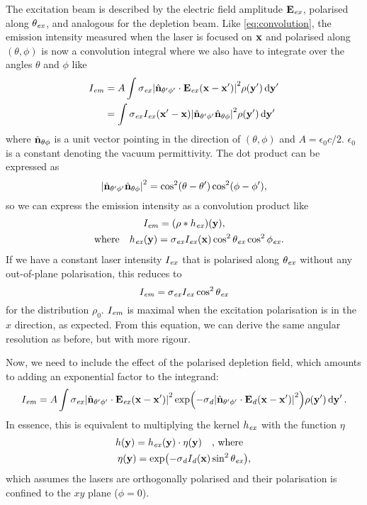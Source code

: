 The excitation beam is described by the electric field amplitude $ \vb{E}_{\mathit{ex}} $, polarised along $ \theta_{\mathit{ex}} $, and analogous for the depletion beam. Like \autoref{eq:convolution}, the emission intensity measured when the laser is focused on $ \vb{x} $ and polarised along $ (\theta, \phi)$ is now a convolution integral where we also have to integrate over the angles $ \theta $ and $ \phi $ like
\begin{equation}
	\begin{aligned}
		I_{\mathit{em}} 
			&= A \int 
				\sigma_{\mathit{ex}} \abs{\hat{\vb{n}}_{\theta'\phi'} \cdot \vb{E}_{\mathit{ex}}(\vb{x}-\vb{x}')}^2 
				\rho(\vb{y}') 
				\dd{\vb{y}'} \\
			&= \int 
				\sigma_{\mathit{ex}} I_{\mathit{ex}}(\vb{x}'-\vb{x}) \abs{\hat{\vb{n}}_{\theta'\phi'}\hat{\vb{n}}_{\theta\phi}}^2
				\rho(\vb{y}') 
				\dd{\vb{y}'}
	\end{aligned}
\end{equation}
where $ \hat{\vb{n}}_{\theta\phi} $ is a unit vector pointing in the direction of $ (\theta, \phi) $ and $ A = \epsilon_0c/2 $. $ \epsilon_0 $ is a constant denoting the vacuum permittivity. The dot product can be expressed as
\begin{equation}
	\abs{\hat{\vb{n}}_{\theta'\phi'}\hat{\vb{n}}_{\theta\phi}}^2 = \cos^2(\theta-\theta') \cos^2(\phi-\phi'),
\end{equation}
so we can express the emission intensity as a convolution product like
\begin{gather}
	I_\emm = (\rho*h_\exc)(\vb{y}), \\
	\qq{where} h_\exc(\vb{y}) = \sigma_\exc I_\exc(\vb{x}) \cos^2\theta_\exc\cos^2\phi_\exc.
\end{gather}
If we have a constant laser intensity $ I_{\mathit{ex}} $ that is polarised along $ \theta_{\mathit{ex}} $ without any out-of-plane polarisation, this reduces to
\begin{equation}
	I_{\mathit{em}} = \sigma_{\mathit{ex}} I_{\mathit{ex}} \cos^2\theta_{\mathit{ex}}
\end{equation}
for the distribution $ \rho_0 $. $ I_{\mathit{em}} $ is maximal when the excitation polarisation is in the $ x $ direction, as expected. From this equation, we can derive the same angular resolution as before, but with more rigour.

Now, we need to include the effect of the polarised depletion field, which amounts to adding an exponential factor to the integrand:
\begin{multline}
	I_{\mathit{em}} = A \int
		\sigma_{\mathit{ex}} \abs{\hat{\vb{n}}_{\theta'\phi'} \cdot \vb{E}_{\mathit{ex}}(\vb{x}-\vb{x}')}^2 
		\exp(-\sigma_{\mathit{d}} \abs{\hat{\vb{n}}_{\theta'\phi'} \cdot \vb{E}_{\mathit{d}}(\vb{x}-\vb{x}')}^2)
		\rho(\vb{y}') 
		\dd{\vb{y}'}.
	\label{eq:psted integral}
\end{multline}
In essence, this is equivalent to multiplying the kernel $ h_{\mathit{ex}} $ with the function $ \eta $
\begin{gather}
	h(\vb{y}) = h_\exc(\vb{y}) \cdot \eta(\vb{y})  \qq{, where} \\
	\eta(\vb{y}) = \exp(-\sigma_\dep I_\dep(\vb{x}) \sin^2 \theta_\exc),
\end{gather}
which assumes the lasers are orthogonally polarised and their polarisation is confined to the $ xy $ plane ($ \phi=0 $).

